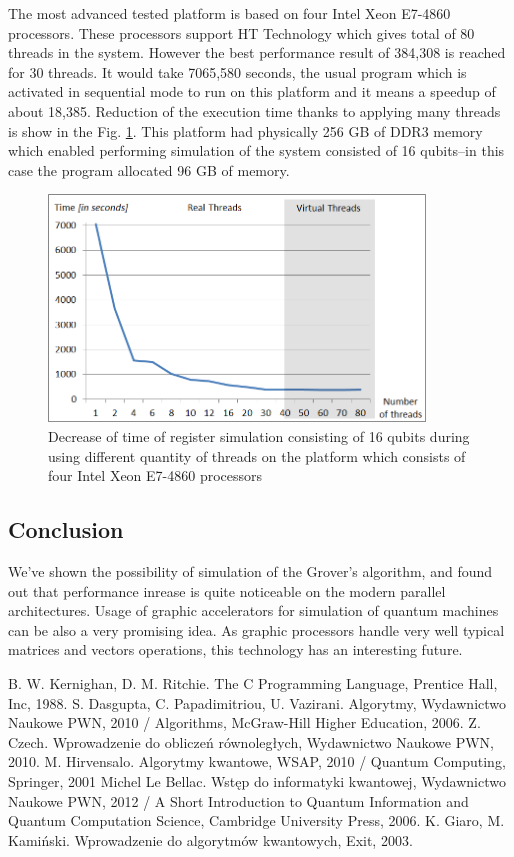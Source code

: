 \documentclass[10pt, a5paper]{article}
\begin{document}
The most advanced tested platform is based on four Intel Xeon E7-4860 processors. These processors support HT Technology which gives total of 80 threads in the system. However the best performance result of 384,308 is reached for 30 threads. It would take 7065,580 seconds, the usual program which is activated in sequential mode to run on this platform and it means a speedup of about 18,385. Reduction of the execution time thanks to applying many threads is show in the Fig. \ref{fig:lf3}. This platform had physically 256 GB of DDR3 memory which enabled performing simulation of the system consisted of 16 qubits--in this case the program allocated 96 GB of memory.

\begin{figure}
  \centering
  \includegraphics[width=10cm]{18_2012_3b.png}
\caption{Decrease of time of register simulation consisting of 16 qubits during using different quantity of threads on the platform which consists of four  Intel Xeon E7-4860 processors}
\label{fig:lf3}
\end{figure}

\subsection*{Conclusion}

We've shown the possibility of simulation of the Grover's algorithm, and found out that performance inrease is quite noticeable on the modern parallel architectures. Usage of graphic accelerators for simulation of quantum machines can be also a very promising idea. As graphic processors handle very well typical matrices and vectors operations, this technology has an interesting future.

\begin{thebibliography}{9}
   B. W. Kernighan, D. M. Ritchie. The C Programming Language, Prentice Hall, Inc, 1988.
   S. Dasgupta, C. Papadimitriou, U. Vazirani. Algorytmy, Wydawnictwo Naukowe PWN, 2010 / Algorithms, McGraw-Hill Higher Education, 2006.
   Z. Czech. Wprowadzenie do obliczeń równoległych, Wydawnictwo Naukowe PWN, 2010.
   M. Hirvensalo. Algorytmy kwantowe, WSAP, 2010 / Quantum Computing, Springer, 2001
   Michel Le Bellac. Wstęp do informatyki kwantowej, Wydawnictwo Naukowe PWN, 2012 / A Short Introduction to Quantum Information and Quantum Computation Science, Cambridge University Press, 2006.
   K. Giaro, M. Kamiński. Wprowadzenie do algorytmów kwantowych, Exit, 2003.
\end{thebibliography}
\end{document}
